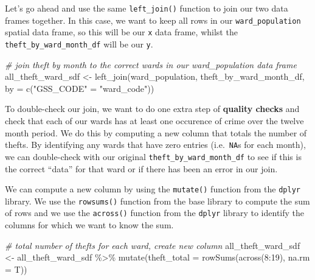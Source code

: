 \documentclass[
]{book}
\newenvironment{Shaded}{\begin{snugshade}}{\end{snugshade}}
\newcommand{\AttributeTok}[1]{\textcolor[rgb]{0.77,0.63,0.00}{#1}}
\newcommand{\CommentTok}[1]{\textcolor[rgb]{0.56,0.35,0.01}{\textit{#1}}}
\newcommand{\DecValTok}[1]{\textcolor[rgb]{0.00,0.00,0.81}{#1}}
\newcommand{\FunctionTok}[1]{\textcolor[rgb]{0.00,0.00,0.00}{#1}}
\newcommand{\NormalTok}[1]{#1}
\newcommand{\OtherTok}[1]{\textcolor[rgb]{0.56,0.35,0.01}{#1}}
\newcommand{\SpecialCharTok}[1]{\textcolor[rgb]{0.00,0.00,0.00}{#1}}
\newcommand{\StringTok}[1]{\textcolor[rgb]{0.31,0.60,0.02}{#1}}
\begin{document}
Let's go ahead and use the same \texttt{left\_join()} function to join our two data frames together. In this case, we want to keep all rows in our \texttt{ward\_population} spatial data frame, so this will be our \texttt{x} data frame, whilst the \texttt{theft\_by\_ward\_month\_df} will be our \texttt{y}.

\begin{Shaded}
\begin{Highlighting}[]
\CommentTok{\# join theft by month to the correct wards in our ward\_population data frame}
\NormalTok{all\_theft\_ward\_sdf }\OtherTok{\textless{}{-}} \FunctionTok{left\_join}\NormalTok{(ward\_population, theft\_by\_ward\_month\_df, }\AttributeTok{by =} \FunctionTok{c}\NormalTok{(}\StringTok{"GSS\_CODE"} \OtherTok{=} \StringTok{"ward\_code"}\NormalTok{))}
\end{Highlighting}
\end{Shaded}

To double-check our join, we want to do one extra step of \textbf{quality checks} and check that each of our wards has at least one occurence of crime over the twelve month period. We do this by computing a new column that totals the number of thefts. By identifying any wards that have zero entries (i.e.~\texttt{NA}s for each month), we can double-check with our original \texttt{theft\_by\_ward\_month\_df} to see if this is the correct ``data'' for that ward or if there has been an error in our join.

We can compute a new column by using the \texttt{mutate()} function from the \texttt{dplyr} library. We use the \texttt{rowsums()} function from the base library to compute the sum of rows and we use the \texttt{across()} function from the \texttt{dplyr} library to identify the columns for which we want to know the sum.

\begin{Shaded}
\begin{Highlighting}[]
\CommentTok{\# total number of thefts for each ward, create new column}
\NormalTok{all\_theft\_ward\_sdf }\OtherTok{\textless{}{-}}\NormalTok{ all\_theft\_ward\_sdf }\SpecialCharTok{\%\textgreater{}\%} \FunctionTok{mutate}\NormalTok{(}\AttributeTok{theft\_total =} \FunctionTok{rowSums}\NormalTok{(}\FunctionTok{across}\NormalTok{(}\DecValTok{8}\SpecialCharTok{:}\DecValTok{19}\NormalTok{), }\AttributeTok{na.rm =}\NormalTok{ T))}
\end{Highlighting}
\end{Shaded}
\end{document}
